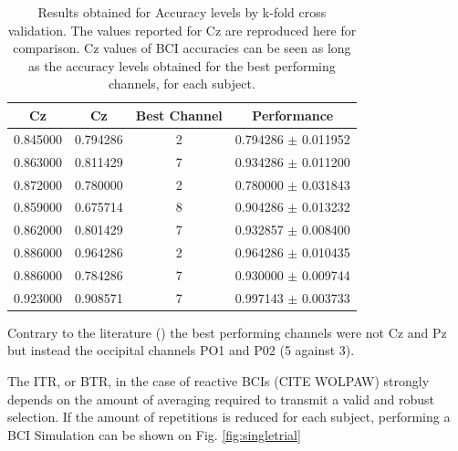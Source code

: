 \documentclass[entropy,article,submit,moreauthors,pdftex,10pt,a4paper]{mdpi}
\begin{document}
\begin{table}[H]
\caption{Results obtained for Accuracy levels by k-fold cross validation. The values reported for Cz are reproduced here for comparison. Cz values of BCI accuracies can be seen as long as the accuracy levels obtained for the best performing channels, for each subject.}
\centering
\begin{tabular}{cccc}
\toprule
\textbf{Cz}	& \textbf{Cz}	& \textbf{Best Channel}	& \textbf{Performance}\\
\midrule
0.845000     & 0.794286 & 2 & 0.794286 $\pm$ 0.011952 \\
0.863000     & 0.811429 & 7 & 0.934286 $\pm$ 0.011200 \\
0.872000     & 0.780000 & 2 & 0.780000 $\pm$ 0.031843 \\
0.859000     & 0.675714 & 8 & 0.904286 $\pm$ 0.013232 \\
0.862000     & 0.801429 & 7 & 0.932857 $\pm$ 0.008400 \\
0.886000     & 0.964286 & 2 & 0.964286 $\pm$ 0.010435 \\
0.886000     & 0.784286 & 7 & 0.930000 $\pm$ 0.009744 \\
0.923000     & 0.908571 & 7 & 0.997143 $\pm$ 0.003733 \\
\bottomrule
\end{tabular}
\end{table}

Contrary to the literature (\citep{Huggins2016,Jure2016}) the best performing channels were not Cz and Pz but instead the occipital channels PO1 and P02 (5 against 3).

The ITR, or BTR, in the case of reactive BCIs (CITE WOLPAW) strongly depends on the amount of averaging required to transmit a valid and robust selection.  If the amount of repetitions is reduced for each subject, performing a BCI Simulation can be shown on Fig. \ref{fig:singletrial}
\end{document}
